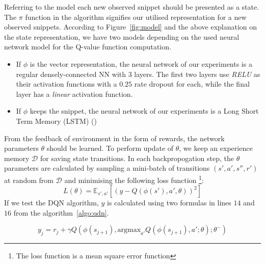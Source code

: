 Referring to the model each new observed snippet should be presented as a state. The $\pi$ function in the algorithm signifies our utilised representation for a new observed snippets. According to Figure~\ref{fig:model} and the above explanation on the state representation, we have two models depending on the used neural network model for the Q-value function computation. 
\begin{itemize}
\item If $\phi$ is the vector representation, the neural network of our experiments is a regular densely-connected NN with $3$ layers. The first two layers use \textit{RELU} as their activation functions with a $0.25$ rate dropout for each, while the final layer has a \textit{linear} activation function. 
\item If $\phi$ keeps the snippet, the neural network of our experiments is a Long Short Term Memory (LSTM) ()
\end{itemize}

From the feedback of environment in the form of rewards, the network parameters $\theta$ should be learned. To perform update of $\theta$, we keep an experience memory $\mathcal{D}$ for saving state transitions. In each backpropogation step, the $\theta$ parameters are calculated by sampling a mini-batch of transitions $(s', a', s'', r')$ at random from $\mathcal{D}$ and minimising the following loss function \footnote{The loss function is a mean square error function}:
$$L(\theta) = \mathbb{E}_{s', a'}[(y - Q(\phi(s'), a', \theta ))^2]$$
If we test the DQN algorithm, $y$ is calculated using two formulas in lines $14$ and $16$ from the algorithm~\ref{algo:qdn}. 

{\small{$$y_j = r_j + \gamma Q\left( \phi(s_{j+1}), \text{argmax}_{a'} Q(\phi(s_{j+1}), a';\theta); \theta^- \right)$$}}





